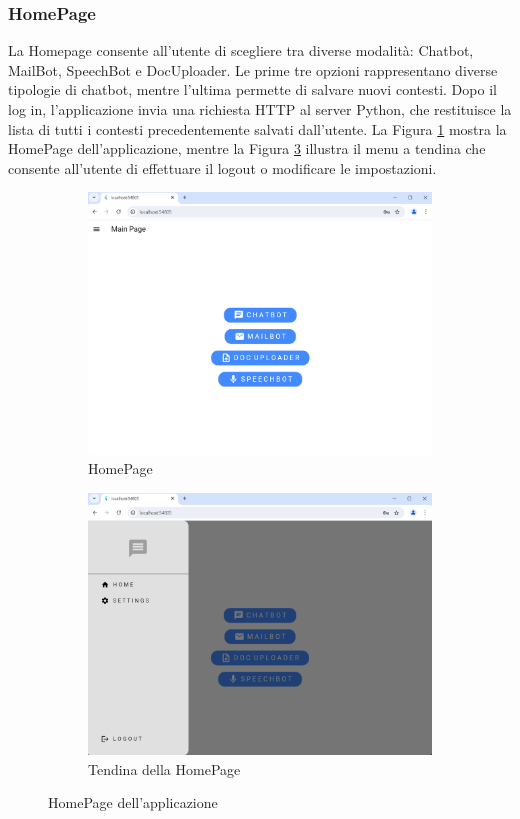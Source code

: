 \subsubsection{HomePage}
La Homepage consente all'utente di scegliere tra diverse modalità: Chatbot, MailBot, SpeechBot e DocUploader. Le prime tre opzioni rappresentano diverse tipologie di chatbot, mentre l'ultima permette di salvare nuovi contesti. Dopo il log in, l'applicazione invia una richiesta HTTP al server Python, che restituisce la lista di tutti i contesti precedentemente salvati dall'utente.
La Figura \ref{fig:home-page} mostra la HomePage dell'applicazione, mentre la Figura \ref{fig:window-home-page} illustra il menu a tendina che consente all'utente di effettuare il logout o modificare le impostazioni.
\begin{figure}[H]
	\centering
	\begin{subfigure}{.5\textwidth}
		\centering
		\includegraphics[width=0.45\linewidth]{Immagini/home_page.png}
		\caption{HomePage\newline}
		\label{fig:home-page}
	\end{subfigure}%
	\begin{subfigure}{.5\textwidth}
		\centering
		\includegraphics[width=0.45\linewidth]{Immagini/home_page_window.png}
		\caption{Tendina della HomePage\newline}
		\label{fig:window-home-page}
	\end{subfigure}
	\caption{HomePage dell'applicazione}
\end{figure}

